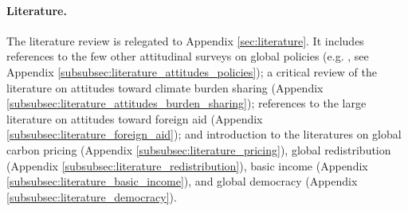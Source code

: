\paragraph{Literature.} The literature review is relegated to Appendix \ref{sec:literature}. It includes references to the few other attitudinal surveys on global policies (e.g. \citet{carattini_how_2019,issp_international_2019,ghassim_public_2022}, see Appendix \ref{subsubsec:literature_attitudes_policies}); a critical review of the literature on attitudes toward climate burden sharing (Appendix \ref{subsubsec:literature_attitudes_burden_sharing}); references to the large literature on attitudes toward foreign aid (Appendix \ref{subsubsec:literature_foreign_aid}); and introduction to the literatures on global carbon pricing (Appendix \ref{subsubsec:literature_pricing}), global redistribution (Appendix \ref{subsubsec:literature_redistribution}), basic income (Appendix \ref{subsubsec:literature_basic_income}), and global democracy (Appendix \ref{subsubsec:literature_democracy}). 


